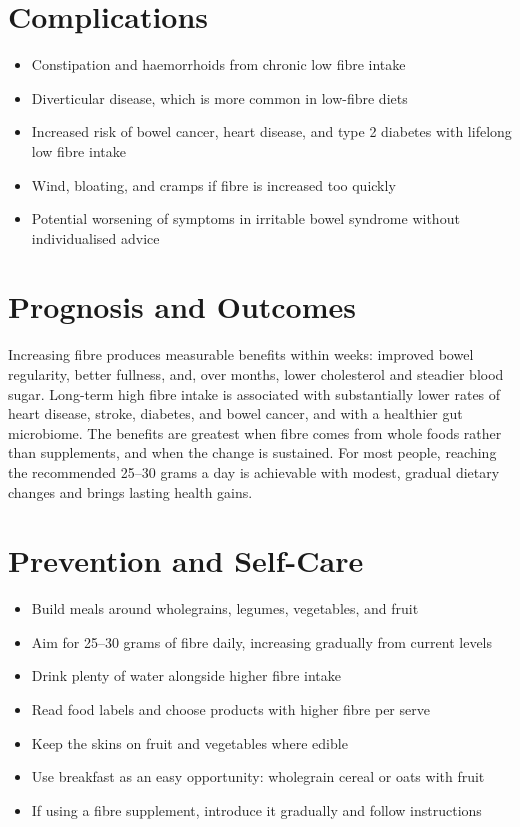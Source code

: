 \section*{Complications}
\begin{itemize}
    \item Constipation and haemorrhoids from chronic low fibre intake
    \item Diverticular disease, which is more common in low-fibre diets
    \item Increased risk of bowel cancer, heart disease, and type 2 diabetes with lifelong low fibre intake
    \item Wind, bloating, and cramps if fibre is increased too quickly
    \item Potential worsening of symptoms in irritable bowel syndrome without individualised advice
\end{itemize}

\section*{Prognosis and Outcomes}
Increasing fibre produces measurable benefits within weeks: improved bowel regularity, better fullness, and, over months, lower cholesterol and steadier blood sugar. Long-term high fibre intake is associated with substantially lower rates of heart disease, stroke, diabetes, and bowel cancer, and with a healthier gut microbiome. The benefits are greatest when fibre comes from whole foods rather than supplements, and when the change is sustained. For most people, reaching the recommended 25--30 grams a day is achievable with modest, gradual dietary changes and brings lasting health gains.

\section*{Prevention and Self-Care}
\begin{itemize}
    \item Build meals around wholegrains, legumes, vegetables, and fruit
    \item Aim for 25--30 grams of fibre daily, increasing gradually from current levels
    \item Drink plenty of water alongside higher fibre intake
    \item Read food labels and choose products with higher fibre per serve
    \item Keep the skins on fruit and vegetables where edible
    \item Use breakfast as an easy opportunity: wholegrain cereal or oats with fruit
    \item If using a fibre supplement, introduce it gradually and follow instructions
\end{itemize}


